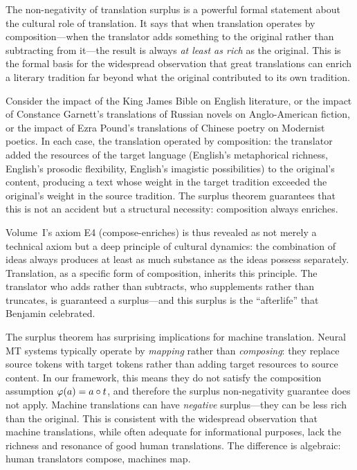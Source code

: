 \begin{interpretation}
\label{interp:surplus-cultural}
The non-negativity of translation surplus is a powerful formal statement about the cultural role of translation.  It says that when translation operates by composition---when the translator adds something to the original rather than subtracting from it---the result is always \emph{at least as rich} as the original.  This is the formal basis for the widespread observation that great translations can enrich a literary tradition far beyond what the original contributed to its own tradition.

Consider the impact of the King James Bible on English literature, or the impact of Constance Garnett's translations of Russian novels on Anglo-American fiction, or the impact of Ezra Pound's translations of Chinese poetry on Modernist poetics.  In each case, the translation operated by composition: the translator added the resources of the target language (English's metaphorical richness, English's prosodic flexibility, English's imagistic possibilities) to the original's content, producing a text whose weight in the target tradition exceeded the original's weight in the source tradition.  The surplus theorem guarantees that this is not an accident but a structural necessity: composition always enriches.

Volume~I's axiom E4 (compose-enriches) is thus revealed as not merely a technical axiom but a deep principle of cultural dynamics: the combination of ideas always produces at least as much substance as the ideas possess separately.  Translation, as a specific form of composition, inherits this principle.  The translator who adds rather than subtracts, who supplements rather than truncates, is guaranteed a surplus---and this surplus is the ``afterlife'' that Benjamin celebrated.
\end{interpretation}

\begin{remark}
The surplus theorem has surprising implications for machine translation.  Neural MT systems typically operate by \emph{mapping} rather than \emph{composing}: they replace source tokens with target tokens rather than adding target resources to source content.  In our framework, this means they do not satisfy the composition assumption $\varphi(a) = a \circ t$, and therefore the surplus non-negativity guarantee does not apply.  Machine translations can have \emph{negative} surplus---they can be less rich than the original.  This is consistent with the widespread observation that machine translations, while often adequate for informational purposes, lack the richness and resonance of good human translations.  The difference is algebraic: human translators compose, machines map.
\end{remark}

